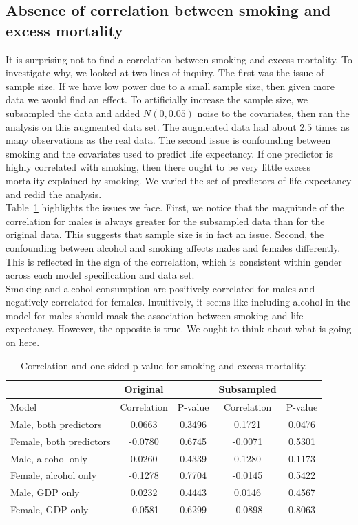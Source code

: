 \documentclass{article}
\begin{document}
\subsection{Absence of correlation between smoking and excess mortality}
It is surprising not to find a correlation between smoking and excess mortality.  To investigate why, we looked at two lines of inquiry.  The first was the issue of sample size.  If we have low power due to a small sample size, then given more data we would find an effect.  To artificially increase the sample size, we subsampled the data and added $N(0, 0.05)$ noise to the covariates, then ran the analysis on this augmented data set.  The augmented data had about $2.5$ times as many observations as the real data. The second issue is confounding between smoking and the covariates used to predict life expectancy.  If one predictor is highly correlated with smoking, then there ought to be very little excess mortality explained by smoking.  We varied the set of predictors of life expectancy and redid the analysis.  \\

Table~\ref{tab:smoking_sensitivity} highlights the issues we face.  First, we notice that the magnitude of the correlation for males is always greater for the subsampled data than for the original data.  This suggests that sample size is in fact an issue.  Second, the confounding between alcohol and smoking affects males and females differently.  This is reflected in the sign of the correlation, which is consistent within gender across each model specification and data set.  \\

Smoking and alcohol consumption are positively correlated for males and negatively correlated for females.  Intuitively, it seems like including alcohol in the model for males should mask the association between smoking and life expectancy.  However, the opposite is true.  We ought to think about what is going on here.

\begin{table}[h]
\begin{center}
\begin{tabular}{l cc|cc }
& Original && Subsampled & \\
\hline\hline
 Model & Correlation & P-value & Correlation & P-value  \\ \hline
 Male, both predictors & 0.0663 & 0.3496 & 0.1721 & 0.0476\\ 
 Female, both predictors & -0.0780 & 0.6745 & -0.0071 & 0.5301\\ \hline
 Male, alcohol only & 0.0260 & 0.4339 & 0.1280 & 0.1173\\ 
 Female, alcohol only & -0.1278 & 0.7704 & -0.0145 & 0.5422\\ \hline
 Male, GDP only & 0.0232 & 0.4443 & 0.0146 & 0.4567\\ 
 Female, GDP only & -0.0581 & 0.6299 & -0.0898 & 0.8063\\ 
\hline
 \end{tabular}
\end{center}
\caption{Correlation and one-sided p-value for smoking and excess mortality.}
\label{tab:smoking_sensitivity}
\end{table}%
\end{document}

